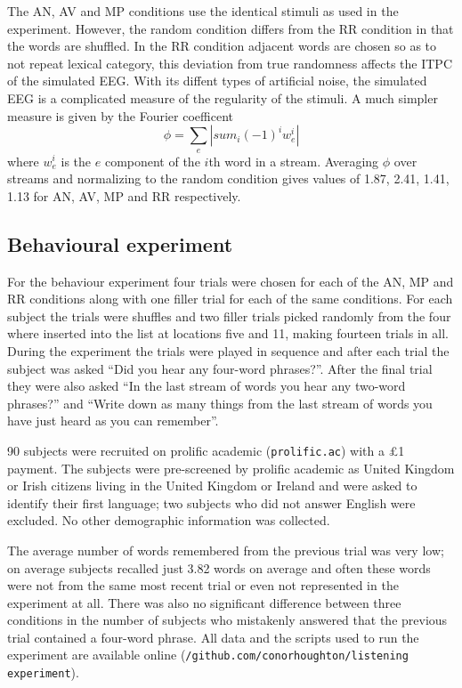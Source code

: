 \documentclass[10pt,letterpaper]{article}
\begin{document}
The AN, AV and MP conditions use the identical stimuli as used in the
experiment. However, the random condition differs from the RR
condition in that the words are shuffled. In the RR condition
adjacent words are chosen so as to not repeat lexical category, this
deviation from true randomness affects the ITPC of the
simulated EEG. With its diffent types of artificial noise, the simulated
EEG is a complicated measure of the regularity of the stimuli. A much
simpler measure is given by the Fourier coefficent
\begin{equation}
  \phi= \sum_e\left|sum_i (-1)^iw_e^i\right|
\end{equation}
where $w_e^i$ is the $e$ component of the $i$th word in a
stream. Averaging $\phi$ over streams and normalizing to the random
condition gives values of 1.87, 2.41, 1.41, 1.13 for AN, AV, MP and RR
respectively.


\subsection*{Behavioural experiment}

For the behaviour experiment four trials were chosen for each of the
AN, MP and RR conditions along with one filler trial for each of the
same conditions. For each subject the trials were shuffles and two
filler trials picked randomly from the four where inserted into the
list at locations five and 11, making fourteen trials in all. During
the experiment the trials were played in sequence and after each trial
the subject was asked ``Did you hear any four-word phrases?''. After
the final trial they were also asked ``In the last stream of words you
hear any two-word phrases?'' and ``Write down as many things from the
last stream of words you have just heard as you can remember''.

90 subjects were recruited on prolific academic (\texttt{prolific.ac})
with a £1 payment. The subjects were pre-screened by prolific academic
as United Kingdom or Irish citizens living in the United Kingdom or
Ireland and were asked to identify their first language; two subjects
who did not answer English were excluded. No other demographic
information was collected.

The average number of words remembered from the previous trial was
very low; on average subjects recalled just 3.82 words on average and
often these words were not from the same most recent trial or even not
represented in the experiment at all. There was also no significant
difference between three conditions in the number of subjects who
mistakenly answered that the previous trial contained a four-word
phrase. All data and the scripts used to run the experiment are
available online
(\texttt{/github.com/conorhoughton/listening\textunderscore
  experiment}).
\end{document}
